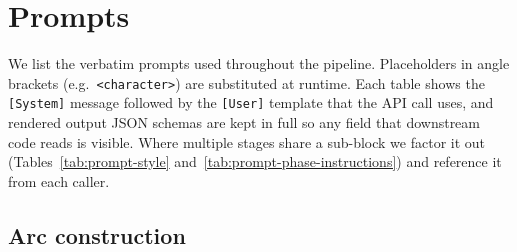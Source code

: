 \documentclass[11pt]{article}
\begin{document}
\clearpage
\section{Prompts\label{app:prompts}}

We list the verbatim prompts used throughout the pipeline. Placeholders in angle brackets (e.g.\ \texttt{<character>}) are substituted at runtime. Each table shows the \texttt{[System]} message followed by the \texttt{[User]} template that the API call uses, and rendered output JSON schemas are kept in full so any field that downstream code reads is visible. Where multiple stages share a sub-block we factor it out (Tables~\ref{tab:prompt-style} and~\ref{tab:prompt-phase-instructions}) and reference it from each caller.

\clearpage
\subsection{Arc construction}
\end{document}
